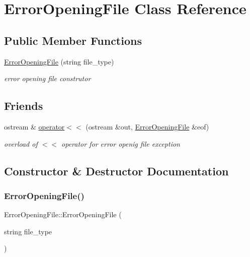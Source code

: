 \hypertarget{class_error_opening_file}{}\section{Error\+Opening\+File Class Reference}
\label{class_error_opening_file}
\subsection*{Public Member Functions}
\begin{DoxyCompactItemize}
\item 
\hyperlink{class_error_opening_file_a1e5ab065abd8e5cfa827730f9e9b06d4}{Error\+Opening\+File} (string file\+\_\+type)
\begin{DoxyCompactList}\small\item\em error opening file construtor \end{DoxyCompactList}\end{DoxyCompactItemize}
\subsection*{Friends}
\begin{DoxyCompactItemize}
\item 
ostream \& \hyperlink{class_error_opening_file_af72ed5066b7bbfc4485454291cb5356c}{operator$<$$<$} (ostream \&out, \hyperlink{class_error_opening_file}{Error\+Opening\+File} \&eof)
\begin{DoxyCompactList}\small\item\em overload of $<$$<$ operator for error openig file exception \end{DoxyCompactList}\end{DoxyCompactItemize}


\subsection{Constructor \& Destructor Documentation}
\hypertarget{class_error_opening_file_a1e5ab065abd8e5cfa827730f9e9b06d4}{}\label{class_error_opening_file_a1e5ab065abd8e5cfa827730f9e9b06d4} 
\subsubsection{\texorpdfstring{Error\+Opening\+File()}{ErrorOpeningFile()}}
{\footnotesize\ttfamily Error\+Opening\+File\+::\+Error\+Opening\+File (\begin{DoxyParamCaption}\item[{string}]{file\+\_\+type }\end{DoxyParamCaption})\hspace{0.3cm}{\ttfamily [inline]}}



